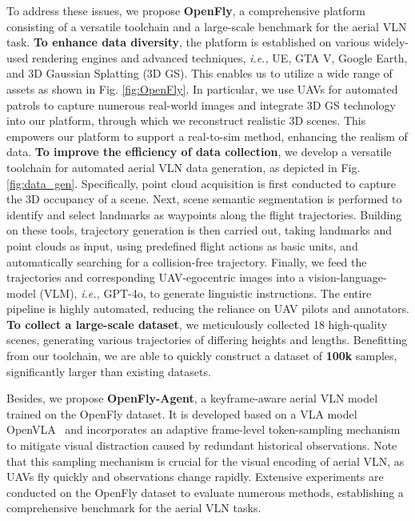To address these issues, we propose \textbf{OpenFly}, a comprehensive platform consisting of a versatile toolchain and a large-scale benchmark for the aerial VLN task. \textbf{To enhance data diversity}, the platform is established on various widely-used rendering engines and advanced techniques, \emph{i.e.,} UE, GTA V, Google Earth, and 3D Gaussian Splatting (3D GS). This enables us to utilize a wide range of assets as shown in Fig. \ref{fig:OpenFly}. In particular, we use UAVs for automated patrols to capture numerous real-world images and integrate 3D GS technology into our platform, through which we reconstruct realistic 3D scenes. This empowers our platform to support a real-to-sim method, enhancing the realism of data. \textbf{To improve the efficiency of data collection}, we develop a versatile toolchain for automated aerial VLN data generation, as depicted in Fig. \ref{fig:data_gen}. Specifically, point cloud acquisition is first conducted to capture the 3D occupancy of a scene. Next, scene semantic segmentation is performed to identify and select landmarks as waypoints along the flight trajectories. Building on these tools, trajectory generation is then carried out, taking landmarks and point clouds as input, using predefined flight actions as basic units, and automatically searching for a collision-free trajectory. Finally, we feed the trajectories and corresponding UAV-egocentric images into a vision-language-model (VLM), \emph{i.e.,} GPT-4o, to generate linguistic instructions. The entire pipeline is highly automated, reducing the reliance on UAV pilots and annotators. \textbf{To collect a large-scale dataset}, we meticulously collected 18 high-quality scenes, generating various trajectories of differing heights and lengths. Benefitting from our toolchain, we are able to quickly construct a dataset of \textbf{100k} samples, significantly larger than existing datasets.

Besides, we propose \textbf{OpenFly-Agent}, a keyframe-aware aerial VLN model trained on the OpenFly dataset. It is developed based on a VLA model OpenVLA~\cite{openvla} and incorporates an adaptive frame-level token-sampling mechanism to mitigate visual distraction caused by redundant historical observations. Note that this sampling mechanism is crucial for the visual encoding of aerial VLN, as UAVs fly quickly and observations change rapidly. Extensive experiments are conducted on the OpenFly dataset to evaluate numerous methods, establishing a comprehensive benchmark for the aerial VLN tasks.

